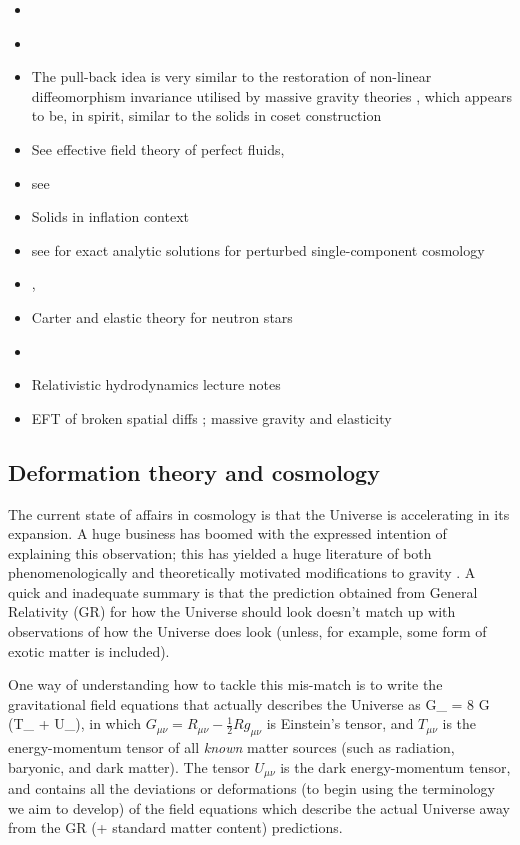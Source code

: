 \begin{itemize}
\item \cite{WernigPichler:2006mw}
\item  \cite{Pourtsidou:2013nha}
\item The pull-back idea is very similar to the restoration of non-linear diffeomorphism invariance utilised by massive gravity theories \cite{deRham:2014zqa}, which appears to be, in spirit, similar to the solids in coset construction \cite{Nicolis:2013lma, Nicolis:2015sra}
\item See effective field theory of perfect fluids, \cite{Ballesteros:2012kv}
\item see \cite{Bel:1996pb} \cite{Polak:2007dm}
\item Solids in inflation context \cite{Gruzinov:2004ty, Endlich:2012pz, Bartolo:2014xfa}
\item see \cite{Skovran:2014dka} for exact analytic solutions for perturbed single-component cosmology 
\item \cite{Frauendiener:2007yx}, \cite{Kijowski:1994eq}
\item Carter and elastic theory for neutron stars \cite{Carter:2005gg}
\item 
\item Relativistic hydrodynamics lecture notes \cite{Gourgoulhon:2006bn}
\item EFT of broken spatial diffs \cite{Lin:2015cqa}; massive gravity and elasticity \cite{Battye:2013er}
\end{itemize}

\subsection{Deformation theory and cosmology}
The current state of affairs in cosmology is that the Universe is accelerating in its expansion. A huge business has boomed with the expressed intention of explaining this observation; this has yielded a huge literature of both phenomenologically and theoretically motivated modifications to gravity \cite{Clifton:2011jh, Joyce:2014kja}. A quick and   inadequate  summary is that the prediction obtained from General Relativity (GR) for how the Universe should look doesn't match up with observations of how the Universe does look (unless, for example, some form of exotic matter is included). 

One   way of understanding how to tackle this mis-match is to write the gravitational field equations that actually describes the Universe as
\bea
G_{\mu\nu} = 8 \pi G \left(T_{\mu\nu} + U_{\mu\nu}\right),
\eea
in which $G_{\mu\nu} = R_{\mu\nu} - \tfrac{1}{2}Rg_{\mu\nu}$ is Einstein's tensor, and $T_{\mu\nu}$ is the energy-momentum tensor of all \textit{known} matter sources (such as radiation, baryonic, and dark matter). The tensor $U_{\mu\nu}$ is the dark energy-momentum tensor, and contains all the deviations or deformations (to begin using the terminology we aim to develop) of the field equations which describe the actual Universe away from the GR (+ standard matter content) predictions. 

